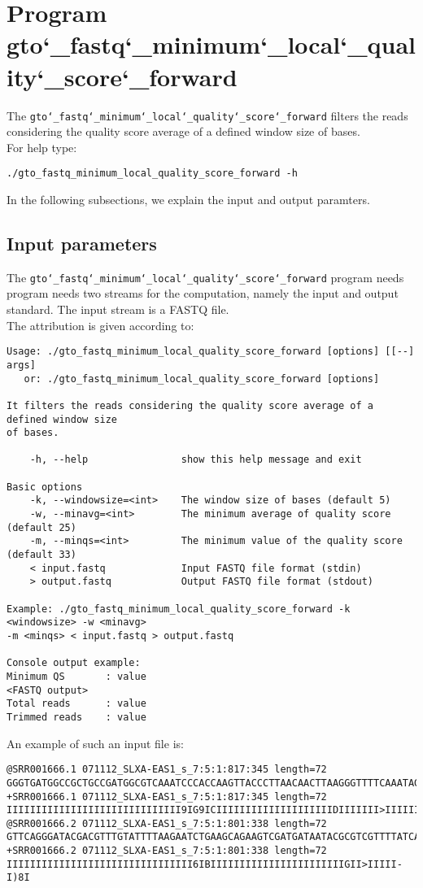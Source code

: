 \section{Program gto\char`_fastq\char`_minimum\char`_local\char`_quality\char`_score\char`_forward}
The \texttt{gto\char`_fastq\char`_minimum\char`_local\char`_quality\char`_score\char`_forward} filters the reads considering the quality score average of a defined window size of bases.\\
For help type:
\begin{lstlisting}
./gto_fastq_minimum_local_quality_score_forward -h
\end{lstlisting}
In the following subsections, we explain the input and output paramters.

\subsection*{Input parameters}

The \texttt{gto\char`_fastq\char`_minimum\char`_local\char`_quality\char`_score\char`_forward} program needs program needs two streams for the computation, namely the input and output standard. The input stream is a FASTQ file.\\
The attribution is given according to:
\begin{lstlisting}
Usage: ./gto_fastq_minimum_local_quality_score_forward [options] [[--] args]
   or: ./gto_fastq_minimum_local_quality_score_forward [options]

It filters the reads considering the quality score average of a defined window size 
of bases.

    -h, --help                show this help message and exit

Basic options
    -k, --windowsize=<int>    The window size of bases (default 5)
    -w, --minavg=<int>        The minimum average of quality score (default 25)
    -m, --minqs=<int>         The minimum value of the quality score (default 33)
    < input.fastq             Input FASTQ file format (stdin)
    > output.fastq            Output FASTQ file format (stdout)

Example: ./gto_fastq_minimum_local_quality_score_forward -k <windowsize> -w <minavg> 
-m <minqs> < input.fastq > output.fastq

Console output example:
Minimum QS       : value
<FASTQ output>
Total reads      : value
Trimmed reads    : value
\end{lstlisting}
An example of such an input file is:
\begin{lstlisting}
@SRR001666.1 071112_SLXA-EAS1_s_7:5:1:817:345 length=72
GGGTGATGGCCGCTGCCGATGGCGTCAAATCCCACCAAGTTACCCTTAACAACTTAAGGGTTTTCAAATAGA
+SRR001666.1 071112_SLXA-EAS1_s_7:5:1:817:345 length=72
IIIIIIIIIIIIIIIIIIIIIIIIIIIIII9IG9ICIIIIIIIIIIIIIIIIIIIIDIIIIIII>IIIIII/
@SRR001666.2 071112_SLXA-EAS1_s_7:5:1:801:338 length=72
GTTCAGGGATACGACGTTTGTATTTTAAGAATCTGAAGCAGAAGTCGATGATAATACGCGTCGTTTTATCAT
+SRR001666.2 071112_SLXA-EAS1_s_7:5:1:801:338 length=72
IIIIIIIIIIIIIIIIIIIIIIIIIIIIIIII6IBIIIIIIIIIIIIIIIIIIIIIIIGII>IIIII-I)8I
\end{lstlisting}

